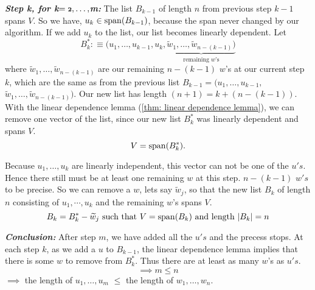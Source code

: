 \begin{prf}
  \emph{\bfseries Step k, for k$=\mathbf{\mathsmaller{2}, \ldots,}$m:} The list $B_{k-1}$ of length $n$ from previous step $k-1$ spans $V$. So we have, $u_k \in \operatorname{span} (B_{k-1})$, because the span never changed by our algorithm. If we add $u_k$ to the list, our list becomes linearly dependent. Let
  \begin{equation*}
    B_k^* :\equiv (u_1, \ldots, u_{k-1}, u_k, \underbrace{\widetilde w_{1}, \ldots, \widetilde w_{n-(k-1)})}_{\text{remaining $w$'s}}
  \end{equation*}
  where $\widetilde w_{1}, \ldots, \widetilde w_{n-(k-1)}$ are our remaining $n-(k-1)$ $w$'s at our current step $k$, which are the same as from the previous list $B_{k-1}$$=$$(u_1, \ldots,u_{k-1},$$ \widetilde w_{1}, \ldots, \widetilde w_{n-(k-1)})$. Our new list has length $(n+1) = k + (n-(k-1))$. With the linear dependence lemma (\ref{thm: linear dependence lemma}), we can remove one vector of the list, since our new list $B_{k}^*$ was linearly dependent and spans $V$.
  \begin{equation*}
    V=\operatorname{span} (B_{k}^*).
  \end{equation*}

  Because $u_1, \ldots, u_k$ are linearly independent, this vector can not be one of the $u's$. Hence there still must be at least one remaining $w$ at this step. $n-(k-1)$ $w's$ to be precise. So we can remove a $w$, lets say $\widetilde w_j$, so that the new list $B_k$ of length $n$ consisting of $u_1, \cdots, u_k$ and the remaining $w$'s spans $V$.
  \begin{equation*}
    B_k = B_k^* - \widetilde w_j$ such that $ V=\myspan{B_k}$ and length $|B_k|=n
  \end{equation*}

  \emph{\bfseries Conclusion:} After step $m$, we have added all the $u's$ and the precess stops. At each step $k$, as we add a $u$ to $B_{k-1}$, the linear dependence lemma implies that there is some $w$ to remove from $B_{k}^*$. Thus there are at least as many $w$'s as $u's$.
  \begin{equation*}
    \implies m \leq n
  \end{equation*}
  $\implies$ the length of $u_1, \ldots, u_m$ $\leq$ the length of $w_1, \ldots, w_n$.
\end{prf}

